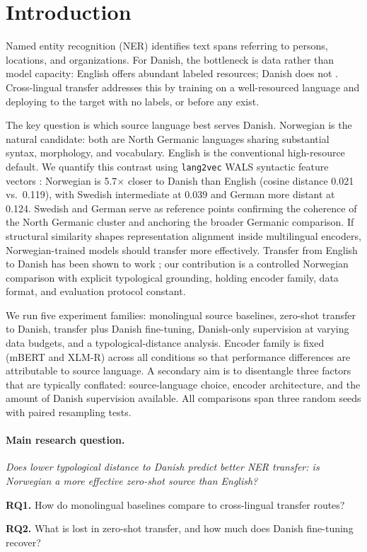 \section{Introduction}

Named entity recognition (NER) identifies text spans referring to persons, locations, and organizations. For Danish, the bottleneck is data rather than model capacity: English offers abundant labeled resources; Danish does not \citep{hvingelby2020dane}. Cross-lingual transfer addresses this by training on a well-resourced language and deploying to the target with no labels, or before any exist.

The key question is which source language best serves Danish. Norwegian is the natural candidate: both are North Germanic languages sharing substantial syntax, morphology, and vocabulary. English is the conventional high-resource default. We quantify this contrast using \texttt{lang2vec} WALS syntactic feature vectors \citep{littell2017uriel}: Norwegian is 5.7$\times$ closer to Danish than English (cosine distance 0.021 vs.\ 0.119), with Swedish intermediate at 0.039 and German more distant at 0.124. Swedish and German serve as reference points confirming the coherence of the North Germanic cluster and anchoring the broader Germanic comparison. If structural similarity shapes representation alignment inside multilingual encoders, Norwegian-trained models should transfer more effectively. Transfer from English to Danish has been shown to work \citep{plank2020danish}; our contribution is a controlled Norwegian comparison with explicit typological grounding, holding encoder family, data format, and evaluation protocol constant.

We run five experiment families: monolingual source baselines, zero-shot transfer to Danish, transfer plus Danish fine-tuning, Danish-only supervision at varying data budgets, and a typological-distance analysis. Encoder family is fixed (mBERT and XLM-R) across all conditions so that performance differences are attributable to source language. A secondary aim is to disentangle three factors that are typically conflated: source-language choice, encoder architecture, and the amount of Danish supervision available. All comparisons span three random seeds with paired resampling tests.

\paragraph{Main research question.}
\textit{Does lower typological distance to Danish predict better NER transfer: is Norwegian a more effective zero-shot source than English?}

\noindent\textbf{RQ1.} How do monolingual baselines compare to cross-lingual transfer routes?

\noindent\textbf{RQ2.} What is lost in zero-shot transfer, and how much does Danish fine-tuning recover?

